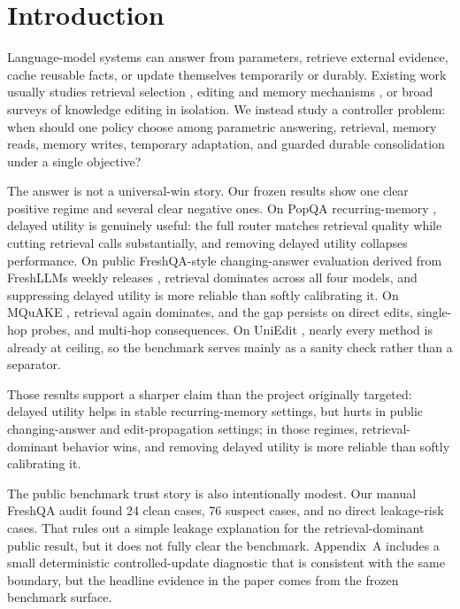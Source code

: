 \section{Introduction}

Language-model systems can answer from parameters, retrieve external evidence, cache reusable facts, or update themselves temporarily or durably. Existing work usually studies retrieval selection \citep{asai2024selfrag,yan2024crag}, editing and memory mechanisms \citep{wang2024wise,yu2023melo}, or broad surveys of knowledge editing \citep{zhang2024keStudy} in isolation. We instead study a controller problem: when should one policy choose among parametric answering, retrieval, memory reads, memory writes, temporary adaptation, and guarded durable consolidation under a single objective?

The answer is not a universal-win story. Our frozen results show one clear positive regime and several clear negative ones. On PopQA recurring-memory \citep{mallen2022trust}, delayed utility is genuinely useful: the full router matches retrieval quality while cutting retrieval calls substantially, and removing delayed utility collapses performance. On public FreshQA-style changing-answer evaluation derived from FreshLLMs weekly releases \citep{vu2024freshllms}, retrieval dominates across all four models, and suppressing delayed utility is more reliable than softly calibrating it. On MQuAKE \citep{zhong2023mquake}, retrieval again dominates, and the gap persists on direct edits, single-hop probes, and multi-hop consequences. On UniEdit \citep{chen2025uniedit}, nearly every method is already at ceiling, so the benchmark serves mainly as a sanity check rather than a separator.

Those results support a sharper claim than the project originally targeted: delayed utility helps in stable recurring-memory settings, but hurts in public changing-answer and edit-propagation settings; in those regimes, retrieval-dominant behavior wins, and removing delayed utility is more reliable than softly calibrating it.

The public benchmark trust story is also intentionally modest. Our manual FreshQA audit found 24 clean cases, 76 suspect cases, and no direct leakage-risk cases. That rules out a simple leakage explanation for the retrieval-dominant public result, but it does not fully clear the benchmark. Appendix~A includes a small deterministic controlled-update diagnostic that is consistent with the same boundary, but the headline evidence in the paper comes from the frozen benchmark surface.

